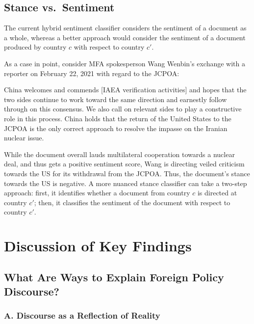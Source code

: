 \documentclass[12pt,letterpaper]{article}
\begin{document}
\subsection{Stance vs.\ Sentiment}
\label{sec:stance}

The current hybrid sentiment classifier considers the sentiment of a document as a whole, whereas a better approach would consider the sentiment of a document produced by country $c$ with respect to country $c'$. 

As a case in point, consider MFA spokesperson Wang Wenbin's exchange with a reporter on February 22, 2021 with regard to the JCPOA: 

\begin{displayquote}
  China welcomes and commends [IAEA verification activities] and hopes that the two sides continue to work toward the same direction and earnestly follow through on this consensus. We also call on relevant sides to play a constructive role in this process. China holds that the return of the United States to the JCPOA is the only correct approach to resolve the impasse on the Iranian nuclear issue.
\end{displayquote}

While the document overall lauds multilateral cooperation towards a nuclear deal, and thus gets a positive sentiment score, Wang is directing veiled criticism towards the US for its withdrawal from the JCPOA. Thus, the document's stance towards the US is negative. A more nuanced stance classifier can take a two-step approach: first, it identifies whether a document from country $c$ is directed at country $c'$; then, it classifies the sentiment of the document with respect to country $c'$.

\section{Discussion of Key Findings}
\label{sec:discussion}

\subsection{What Are Ways to Explain Foreign Policy Discourse?}

\subsubsection*{A. Discourse as a Reflection of Reality}
\end{document}
